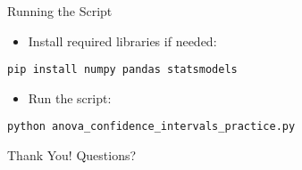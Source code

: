 \documentclass[aspectratio=169]{beamer}
\begin{document}
\begin{frame}[fragile]{Running the Script}
  \begin{itemize}
    \item Install required libraries if needed:
  \end{itemize}
  \begin{verbatim}
pip install numpy pandas statsmodels
  \end{verbatim}
  \begin{itemize}
    \item Run the script:
  \end{itemize}
  \begin{verbatim}
python anova_confidence_intervals_practice.py
  \end{verbatim}
\end{frame}

\begin{frame}
  \centering
  \Huge Thank You!
  \vspace{1cm}
  \normalsize Questions?
\end{frame}
\end{document}
